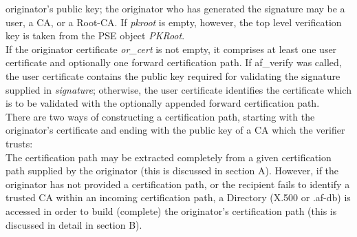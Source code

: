 originator's public key; the originator who has 
generated the signature may be a user, a CA, or a Root-CA.
If {\em pkroot} is empty, however, the top level verification key is 
taken from the PSE object {\em PKRoot}.
\\ [1em]
If the originator certificate {\em or\_cert} is not empty, it
comprises at least one user certificate and optionally one
forward certification path. If af\_verify was called, the user certificate 
contains the public key required for validating the signature supplied in 
{\em signature}; otherwise, the user certificate identifies the
certificate which is to be validated with the optionally appended
forward certification path.
\\ [1em]
There are two ways of constructing a certification path, starting with the 
originator's certificate and ending with the public key of a CA which the 
verifier trusts: \\
The certification path may be extracted completely from a given certification 
path supplied by the originator (this is discussed in section A). 
However, if the originator has not provided a certification path, or the recipient 
fails to identify a trusted CA within an incoming 
certification path, a Directory (X.500 or .af-db) is accessed in order to build 
(complete) the originator's certification path (this is discussed in detail 
in section B).
\\ [1em]

